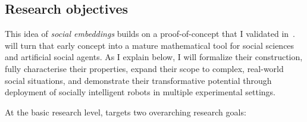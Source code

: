\subsection{Research objectives}


This idea of \emph{social embeddings} builds on a proof-of-concept that I
validated in~\cite{lemaignan2024social}. \project will turn that early concept
into a mature mathematical tool for social sciences and artificial social
agents. As I explain below, I will formalize their construction,  fully
characterise their properties, expand their scope to complex, real-world social
situations, and demonstrate their transformative potential through deployment of
socially intelligent robots in multiple experimental settings.

\vspace{1em}

\noindent At the basic research level, \project targets two overarching research goals:

